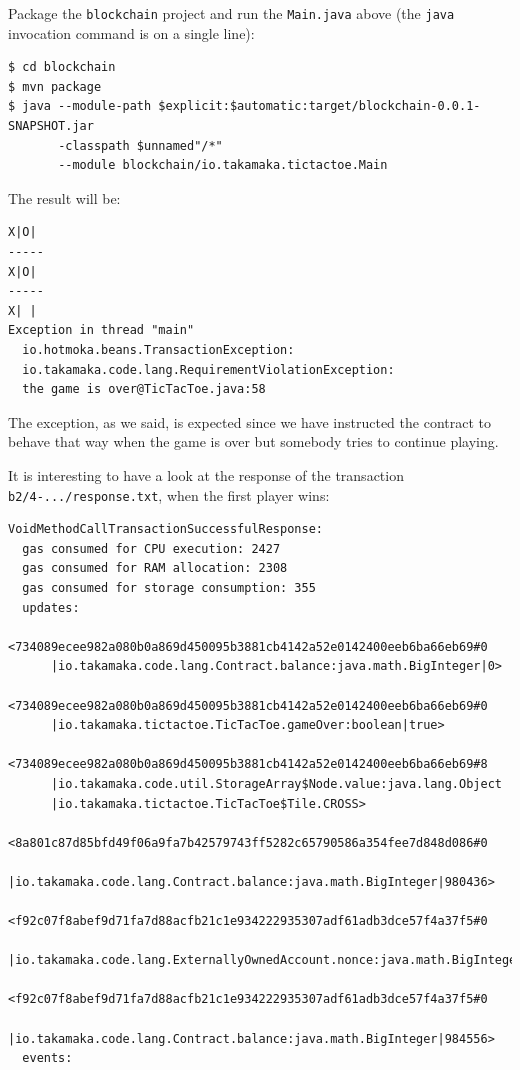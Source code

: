\documentclass[a4paper,]{book}
\begin{document}
{Package the \texttt{blockchain} project and run the \texttt{Main.java}
above (the \texttt{java} invocation command is on a single line):

\begin{myverbatim}
\begin{verbatim}
$ cd blockchain
$ mvn package
$ java --module-path $explicit:$automatic:target/blockchain-0.0.1-SNAPSHOT.jar
       -classpath $unnamed"/*"
       --module blockchain/io.takamaka.tictactoe.Main
\end{verbatim}
\end{myverbatim}

The result will be:

\begin{myverbatim}
\begin{verbatim}
X|O| 
-----
X|O| 
-----
X| | 
Exception in thread "main"
  io.hotmoka.beans.TransactionException:
  io.takamaka.code.lang.RequirementViolationException:
  the game is over@TicTacToe.java:58
\end{verbatim}
\end{myverbatim}

The exception, as we said, is expected since we have instructed the
contract to behave that way when the game is over but somebody tries to
continue playing.

It is interesting to have a look at the response of the transaction
\texttt{b2/4-.../response.txt}, when the first player wins:

\begin{myverbatim}
\begin{verbatim}
VoidMethodCallTransactionSuccessfulResponse:
  gas consumed for CPU execution: 2427
  gas consumed for RAM allocation: 2308
  gas consumed for storage consumption: 355
  updates:
    <734089ecee982a080b0a869d450095b3881cb4142a52e0142400eeb6ba66eb69#0
      |io.takamaka.code.lang.Contract.balance:java.math.BigInteger|0>
    <734089ecee982a080b0a869d450095b3881cb4142a52e0142400eeb6ba66eb69#0
      |io.takamaka.tictactoe.TicTacToe.gameOver:boolean|true>
    <734089ecee982a080b0a869d450095b3881cb4142a52e0142400eeb6ba66eb69#8
      |io.takamaka.code.util.StorageArray$Node.value:java.lang.Object
      |io.takamaka.tictactoe.TicTacToe$Tile.CROSS>
    <8a801c87d85bfd49f06a9fa7b42579743ff5282c65790586a354fee7d848d086#0
      |io.takamaka.code.lang.Contract.balance:java.math.BigInteger|980436>
    <f92c07f8abef9d71fa7d88acfb21c1e934222935307adf61adb3dce57f4a37f5#0
      |io.takamaka.code.lang.ExternallyOwnedAccount.nonce:java.math.BigInteger|3>
    <f92c07f8abef9d71fa7d88acfb21c1e934222935307adf61adb3dce57f4a37f5#0
      |io.takamaka.code.lang.Contract.balance:java.math.BigInteger|984556>
  events:
\end{verbatim}
\end{myverbatim}

}
\end{document}
